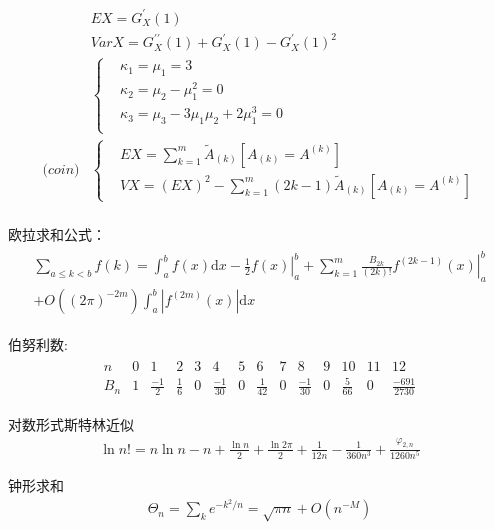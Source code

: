 \documentclass[fontset=windows]{article}
\begin{document}
\begin{align}
      & EX = G_X^\prime (1)                                         \\
      & VarX=G_X^{\prime\prime} (1)+G_X^\prime (1)-G_X^\prime (1)^2 \\
      & \left\{
     \begin{aligned}
           & \kappa_1=\mu_1=3                      \\
           & \kappa_2=\mu_2-\mu_1^2=0              \\
           & \kappa_3=\mu_3-3\mu_1\mu_2+2\mu_1^3=0 \\
     \end{aligned}
     \right.                                                        \\
     \mathrm(coin)
      & \left\{
     \begin{aligned}
           & EX = \sum_{k=1}^m \widetilde A_{(k)}[A_{(k)}=A^{(k)}]               \\
           & VX = (EX)^2-\sum_{k=1}^m (2k-1) \widetilde A_{(k)}[A_{(k)}=A^{(k)}]
     \end{aligned}
     \right.                                                        \\
\end{align}

欧拉求和公式：
\begin{align}
     \begin{gathered}
          \sum_{a \le k<b} f(k)=\int_{a}^{b} f(x) \mathrm{d} x-\left.\frac{1}{2} f(x)\right|_{a} ^{b}+\left.\sum_{k=1}^{m} \frac{B_{2 k}}{(2 k) !} f^{(2 k-1)}(x)\right|_{a} ^{b} \\
          +O\left((2 \pi)^{-2 m}\right) \int_{a}^{b}\left|f^{(2 m)}(x)\right| \mathrm{d} x
     \end{gathered}
\end{align}

伯努利数:
\begin{align}
     \begin{array}{c|ccccccccccccc}
          n            & 0 & 1            & 2           & 3 & 4             & 5 & 6            & 7 & 8             & 9 & 10           & 11 & 12                \\
          \hline B_{n} & 1 & \frac{-1}{2} & \frac{1}{6} & 0 & \frac{-1}{30} & 0 & \frac{1}{42} & 0 & \frac{-1}{30} & 0 & \frac{5}{66} & 0  & \frac{-691}{2730}
     \end{array}
\end{align}

对数形式斯特林近似
\begin{align}
     \ln n !=n \ln n-n+\frac{\ln n}{2}+\frac{\ln 2\pi}{2}+\frac{1}{12 n}-\frac{1}{360 n^{3}}+\frac{\varphi_{2, n}}{1260 n^{5}}
\end{align}

钟形求和
\begin{align}
     \Theta_{n}=\sum_{k} e^{-k^2/n} = \sqrt{\pi n} + O(n^{-M})
\end{align}
\end{document}
